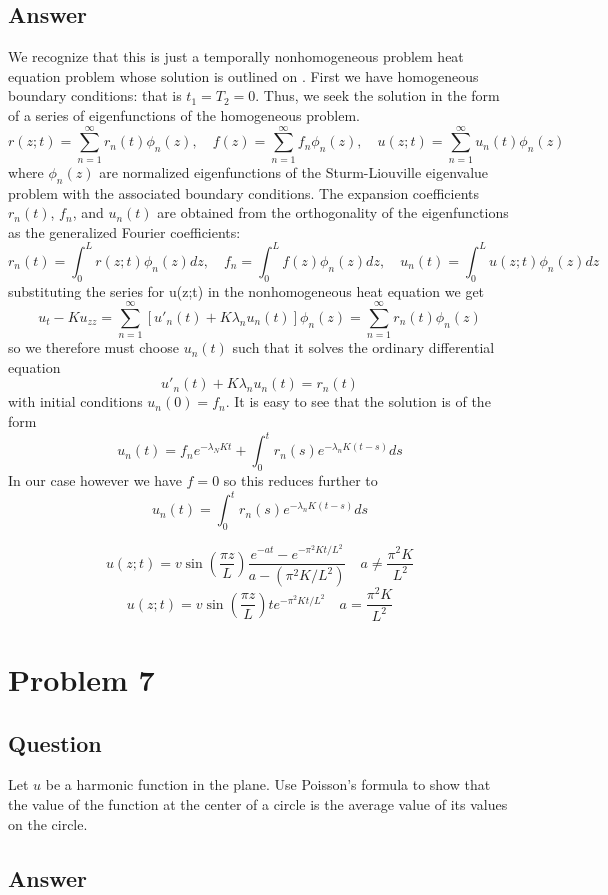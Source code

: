 \documentclass[12pt]{article}
\begin{document}
\subsection{Answer}
We recognize that this is just a temporally nonhomogeneous problem heat equation problem whose solution is outlined on \cite[Page 131]{pinsky}. First we have homogeneous boundary conditions: that is $t_1=T_2=0$. Thus, we seek the solution in the form of a series of eigenfunctions of the homogeneous problem.
\[r(z;t)=\sum_{n=1}^\infty r_n(t)\phi_n(z), \quad f(z) = \sum_{n=1}^\infty f_n\phi_n(z), \quad u(z;t)= \sum_{n=1}^\infty u_n(t) \phi_n(z)\]
where $\phi_n(z)$ are normalized eigenfunctions of the Sturm-Liouville eigenvalue problem with the associated boundary conditions. The expansion coefficients $r_n(t)$, $f_n$, and $u_n(t)$ are obtained from the orthogonality of the eigenfunctions as the generalized Fourier coefficients:
\[r_n(t)=\int_0^L r(z;t)\phi_n(z)dz, \quad f_n = \int_0^L f(z) \phi_n(z) dz , \quad u_n(t)= \int_0^L u(z;t) \phi_n(z) dz\]
substituting the series for u(z;t) in the nonhomogeneous heat equation we get
\[u_t-K u_{zz}=\sum_{n=1}^\infty \left[ u'_n(t)+K\lambda_n u_n(t)\right]\phi_n(z) = \sum_{n=1}^\infty r_n(t) \phi_n(z) \]
so we therefore must choose $u_n(t)$ such that it solves the ordinary differential equation 
\[ u'_n(t)+K\lambda_n u_n(t)= r_n(t)\]
with initial conditions $u_n(0)=f_n$. It is easy to see that the solution is of the form
\[u_n(t)=f_n e^{-\lambda_N K t} + \int_0^t r_n(s) e^{-\lambda_n K (t-s)}ds\]
In our case however we have $f=0$ so this reduces further to
\[u_n(t)= \int_0^t r_n(s) e^{-\lambda_n K (t-s)}ds\]


\[u(z;t)=v \sin{\left( \frac{\pi z}{L} \right) }\frac{e^{-a t}-e^{-\pi^2K t / L^2}}{a-(\pi^2 K/L^2)} \quad a\neq \frac{\pi^2 K}{L^2} \]
\[u(z;t)=v \sin{\left( \frac{\pi z}{L} \right) }t e^{-\pi^2K t /L^2} \quad a = \frac{\pi^2 K}{L^2} \]


\section{Problem 7}
\subsection{Question}
Let $u$ be a harmonic function in the plane. Use Poisson's formula to show that the value of the function at the center of a circle is the average value of its values on the circle.

\subsection{Answer}
\end{document}
